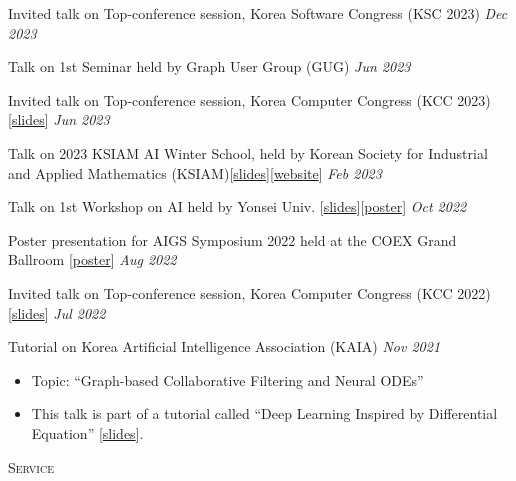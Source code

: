 \documentclass[10pt]{article}
\newenvironment{changemargin}[2]{
  \begin{list}{}{
    \setlength{\topsep}{0pt}
    \setlength{\leftmargin}{#1}
    \setlength{\rightmargin}{#2}
    \setlength{\listparindent}{\parindent}
    \setlength{\itemindent}{\parindent}
    \setlength{\parsep}{\parskip}
  }
  \item[]}{\end{list}
}
\newcommand{\lineover}{
	\begin{changemargin}{-0.05in}{-0.05in}
		\vspace*{-8pt}
		\hrulefill \\
		\vspace*{-2pt}
	\end{changemargin}
}
\newcommand{\header}[1]{
	\begin{changemargin}{-0.5in}{-0.5in}
		\scshape{#1}\\
  	\lineover
	\end{changemargin}
}
\newcommand{\award}[2]{
	{#1} \hfill \emph{#2}\\ \medskip
}
\newenvironment{body} {
	\vspace*{-16pt}
	\begin{changemargin}{-0.25in}{-0.5in}
  }
	{\end{changemargin}
}
\begin{document}
\begin{body}
	\vspace{14pt}
\award{Invited talk on Top-conference session, Korea Software Congress (KSC 2023)} {Dec 2023}
\award{Talk on 1st Seminar held by Graph User Group (GUG)}{Jun 2023}
\award{Invited talk on Top-conference session, Korea Computer Congress (KCC 2023) [\href{https://www.dropbox.com/s/34h6pmr7ftdiuzr/BSPM-KCC23.pptx?dl=0}{slides}]}{Jun 2023}
\award{Talk on 2023 KSIAM AI Winter School, held by Korean Society for Industrial and Applied Mathematics (KSIAM)[\href{https://www.dropbox.com/s/p4sd5h40hcuxcob/KSIAM23-Tutorial-ODE-RecSys.pdf?dl=0}{slides}][\href{https://ksiam.org/Conference/ConferenceView.asp?AC=3&CODE=CD20230101&CpPage=\#CONF}{website}]}{Feb 2023}
\award{Talk on 1st Workshop on AI held by Yonsei Univ. [\href{https://www.dropbox.com/s/9au5xx13qa2l529/AAAI22_workshop.pdf?dl=0}{slides}][\href{https://www.dropbox.com/s/pibzd51d76zy907/AAAI22-Yonsei_AI_Workshop.pdf?dl=0}{poster}]}{Oct 2022}
\award{Poster presentation for AIGS Symposium 2022 held at the COEX Grand Ballroom [\href{https://www.dropbox.com/s/gfjsizak9s4cn9o/AAAI22-AIGS.pdf?dl=0}{poster}]}{Aug 2022}
\award{Invited talk on Top-conference session,  Korea Computer Congress (KCC 2022) [\href{https://www.dropbox.com/s/22d9d92ns8uv9qw/AAAI22_KCC22.pdf?dl=0}{slides}]}{Jul 2022}
\award{Tutorial on Korea Artificial Intelligence Association (KAIA)}{Nov 2021}
	\begin{itemize} \itemsep -0pt  %
        \item Topic: ``Graph-based Collaborative Filtering and Neural ODEs''
		\item This talk is part of a tutorial called ``Deep Learning Inspired by Differential Equation'' [\href{https://www.dropbox.com/s/1xn8xhd6llmhblz/%5BKAIA2021%5DTutorial-LT-OCF.pdf?dl=0}{slides}].
  	\end{itemize}
\end{body}

\medskip

\header{Service}
\end{document}
